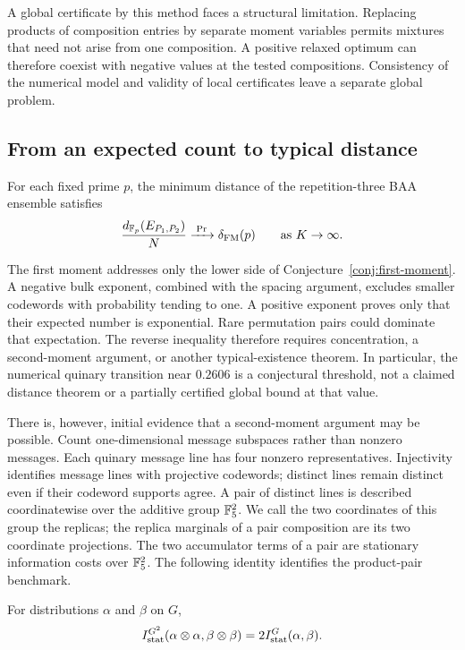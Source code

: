 A global certificate by this method faces a structural limitation.
Replacing products of composition entries by separate moment variables
permits mixtures that need not arise from one composition.  A positive
relaxed optimum can therefore coexist with negative values at the tested
compositions.  Consistency of the numerical model and validity of local
certificates leave a separate global problem.

\subsection{From an expected count to typical distance}

\begin{conjecture}\label{conj:first-moment}
For each fixed prime $p$, the minimum distance of the repetition-three BAA
ensemble satisfies
\[
  \frac{d_{\mathbb F_p}(E_{P_1,P_2})}{N}
  \xrightarrow{\;\Pr\;}\delta_{\rm FM}(p)
  \qquad\text{as }K\to\infty.
\]
\end{conjecture}

The first moment addresses only the lower side of
Conjecture~\ref{conj:first-moment}.  A negative bulk exponent, combined with
the spacing argument, excludes smaller codewords with probability tending to
one.  A positive exponent proves only that their expected number is
exponential.  Rare permutation pairs could dominate that expectation.  The
reverse inequality therefore requires concentration, a second-moment
argument, or another typical-existence theorem.  In particular, the numerical
quinary transition near $0.2606$ is a conjectural threshold, not a claimed
distance theorem or a partially certified global bound at that value.

There is, however, initial evidence that a second-moment argument may be
possible.  Count one-dimensional message subspaces rather than nonzero
messages. Each quinary message line has four nonzero representatives.
Injectivity identifies message lines with projective codewords; distinct
lines remain distinct even if their codeword supports agree.
A pair of distinct lines is described coordinatewise
over the additive group $\mathbb F_5^2$.  We call the two coordinates of this
group the replicas; the replica marginals of a pair composition are its
two coordinate projections.  The two accumulator terms of a pair are
stationary information costs over $\mathbb F_5^2$.  The following identity
identifies the product-pair benchmark.

\begin{proposition}\label{prop:pair-tensor}
For distributions $\alpha$ and $\beta$ on $G$,
\[
 I_{\rm stat}^{G^2}(\alpha\otimes\alpha,\beta\otimes\beta)
 =2I_{\rm stat}^G(\alpha,\beta).
\]
\end{proposition}

